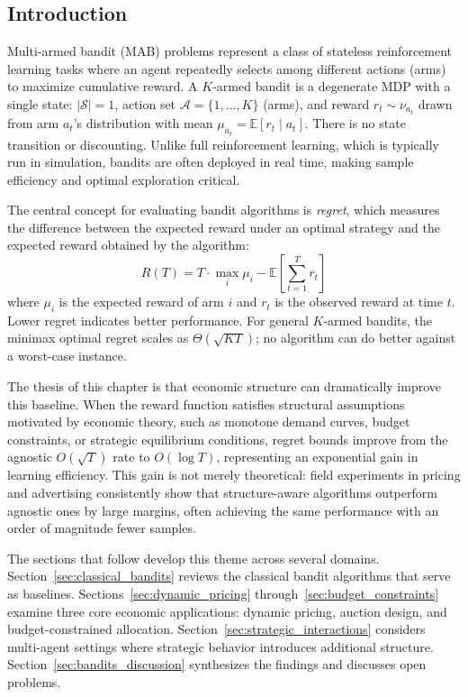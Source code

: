 
\subsection{Introduction}
\label{sec:bandits_intro}

Multi-armed bandit (MAB) problems represent a class of stateless reinforcement learning tasks where an agent repeatedly selects among different actions (arms) to maximize cumulative reward. A $K$-armed bandit is a degenerate MDP with a single state: $|\mathcal{S}| = 1$, action set $\mathcal{A} = \{1, \ldots, K\}$ (arms), and reward $r_t \sim \nu_{a_t}$ drawn from arm $a_t$'s distribution with mean $\mu_{a_t} = \mathbb{E}[r_t \mid a_t]$. There is no state transition or discounting. Unlike full reinforcement learning, which is typically run in simulation, bandits are often deployed in real time, making sample efficiency and optimal exploration critical.

The central concept for evaluating bandit algorithms is \emph{regret}, which measures the difference between the expected reward under an optimal strategy and the expected reward obtained by the algorithm:
\begin{equation}
R(T) = T \cdot \max_{i} \mu_i - \mathbb{E}\left[\sum_{t=1}^{T} r_t\right]
\label{eq:regret}
\end{equation}
where $\mu_i$ is the expected reward of arm $i$ and $r_t$ is the observed reward at time $t$. Lower regret indicates better performance. For general $K$-armed bandits, the minimax optimal regret scales as $\Theta(\sqrt{KT})$; no algorithm can do better against a worst-case instance.

The thesis of this chapter is that economic structure can dramatically improve this baseline. When the reward function satisfies structural assumptions motivated by economic theory, such as monotone demand curves, budget constraints, or strategic equilibrium conditions, regret bounds improve from the agnostic $O(\sqrt{T})$ rate to $O(\log T)$, representing an exponential gain in learning efficiency. This gain is not merely theoretical: field experiments in pricing and advertising consistently show that structure-aware algorithms outperform agnostic ones by large margins, often achieving the same performance with an order of magnitude fewer samples.

The sections that follow develop this theme across several domains. Section~\ref{sec:classical_bandits} reviews the classical bandit algorithms that serve as baselines. Sections~\ref{sec:dynamic_pricing} through~\ref{sec:budget_constraints} examine three core economic applications: dynamic pricing, auction design, and budget-constrained allocation. Section~\ref{sec:strategic_interactions} considers multi-agent settings where strategic behavior introduces additional structure. Section~\ref{sec:bandits_discussion} synthesizes the findings and discusses open problems.

